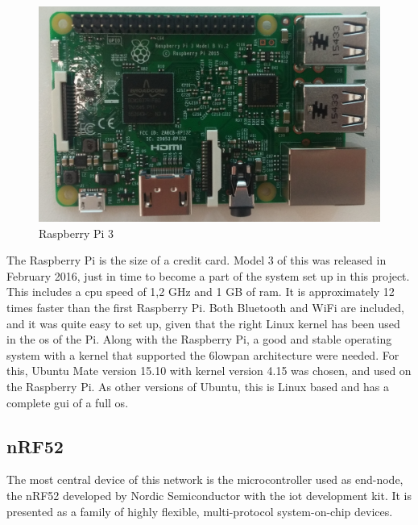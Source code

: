 \begin{figure}[ht]
    \centering
    \includegraphics[scale=0.35]{pi3.png}    
    \caption{Raspberry Pi 3}
    \label{fig:piPicture}
\end{figure}

\noindent The Raspberry Pi is the size of a credit card. Model 3 of this was released in February 2016, just in time to become a part of the system set up in this project. This includes a \gls{cpu} speed of 1,2 GHz and 1 GB of \gls{ram}. It is approximately 12 times faster than the first Raspberry Pi. Both Bluetooth and WiFi are included, and it was quite easy to set up, given that the right Linux kernel has been used in the \gls{os} of the Pi. Along with the Raspberry Pi, a good and stable operating system with a kernel that supported the \gls{6lowpan} architecture were needed. For this, Ubuntu Mate version 15.10 with kernel version 4.15 was chosen, and used on the Raspberry Pi. As other versions of Ubuntu, this is Linux based and has a complete \gls{gui} of a full \gls{os}. %

\subsection{nRF52}

\noindent The most central device of this network is the \gls{microcontroller} used as end-node, the nRF52 developed by Nordic Semiconductor with the \gls{iot} development kit. It is presented as a family of highly flexible, multi-protocol system-on-chip devices. 


